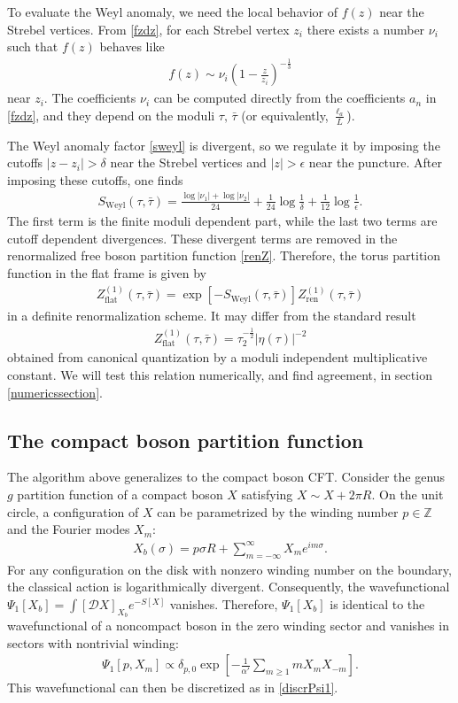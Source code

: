 \documentclass[12pt]{article}
\def\ie{\begin{equation}\begin{aligned}}
\def\fe{\end{aligned}\end{equation}}
\numberwithin{equation}{section}
\begin{document}
To evaluate the Weyl anomaly, we need the local behavior of $f(z)$ near the Strebel vertices. From \eqref{fzdz}, for each Strebel vertex $z_i$ there exists a number $\nu_i$ such that $f(z)$ behaves like
\ie f(z)\sim \nu_i \left(1-\frac{z}{z_i}\right)^{-\frac{1}{3}}
\fe 
near $z_i$. The coefficients $\nu_i$ can be computed directly from the coefficients $a_n$ in \eqref{fzdz}, and they depend on the moduli $\tau,\, \bar{\tau}$ (or equivalently, $\tfrac{\ell_a}{L}$).

The Weyl anomaly factor \eqref{sweyl} is divergent, so we regulate it by imposing the cutoffs $|z-z_i|>\delta$ near the Strebel vertices and $|z|>\epsilon$ near the puncture. After imposing these cutoffs, one finds
\ie \label{genus1Weyl}
S_\text{Weyl}(\tau, \bar{\tau}) = \frac{\log |\nu_1|+\log|\nu_2|}{24}+\frac{1}{24}\log \frac{1}{\delta} +\frac{1}{12} \log \frac{1}{\epsilon}.
\fe
The first term is the finite moduli dependent part, while the last two terms are cutoff dependent divergences. These divergent terms are removed in the renormalized free boson partition function \eqref{renZ}. Therefore, the torus partition function in the flat frame is given by
\ie
Z_\text{flat}^{(1)}(\tau, \bar{\tau}) = \exp\left[-S_\text{Weyl}(\tau, \bar{\tau})\right]Z_\text{ren}^{(1)}(\tau, \bar{\tau})
\fe
in a definite renormalization scheme. It may differ from the standard result
\ie
\label{eq:Zflat}
Z_\text{flat}^{(1)}(\tau, \bar{\tau})=\tau_2^{-\frac12} |\eta(\tau)|^{-2}
\fe
obtained from canonical quantization by a moduli independent multiplicative constant. We will test this relation numerically, and find agreement, in section \ref{numericssection}.

\subsection{The compact boson partition function}

The algorithm above generalizes to the compact boson CFT. Consider the genus $g$ partition function of a compact boson $X$ satisfying $X\sim X+2\pi R$. On the unit circle, a configuration of $X$ can be parametrized by the winding number $p\in\mathbb{Z}$ and the Fourier modes $X_m$:
\ie
X_b(\sigma)=p \sigma R+\sum_{m=-\infty}^\infty X_m e^{im\sigma}.
\fe
For any configuration on the disk with nonzero winding number on the boundary, the classical action is logarithmically divergent. Consequently, the wavefunctional $\Psi_1[X_b]=\int [\mathcal{D}X]_{X_b}e^{-S[X]}$ vanishes. Therefore, $\Psi_1[X_b]$ is identical to the wavefunctional of a noncompact boson in the zero winding sector and vanishes in sectors with nontrivial winding:
\ie
\Psi_1[p,X_m]\propto \delta_{p,0}\exp\left[-\frac{1}{\alpha'}\sum_{m\geq 1}mX_m X_{-m}\right].
\fe
This wavefunctional can then be discretized as in \eqref{discrPsi1}.
\end{document}
